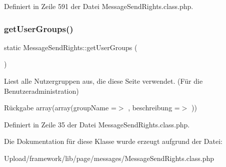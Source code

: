 Definiert in Zeile 591 der Datei Message\+Send\+Rights.\+class.\+php.

\mbox{\label{class_message_send_rights_a3da5ad26d9f72306b8a54345eb5128d0}} 
\subsubsection{\texorpdfstring{get\+User\+Groups()}{getUserGroups()}}
{\footnotesize\ttfamily static Message\+Send\+Rights\+::get\+User\+Groups (\begin{DoxyParamCaption}{ }\end{DoxyParamCaption})\hspace{0.3cm}{\ttfamily [static]}}

Liest alle Nutzergruppen aus, die diese Seite verwendet. (Für die Benutzeradministration) \begin{DoxyReturn}{Rückgabe}
array(array(\textquotesingle{}group\+Name\textquotesingle{} =$>$ \textquotesingle{}\textquotesingle{}, \textquotesingle{}beschreibung\textquotesingle{} =$>$ \textquotesingle{}\textquotesingle{})) 
\end{DoxyReturn}


Definiert in Zeile 35 der Datei Message\+Send\+Rights.\+class.\+php.



Die Dokumentation für diese Klasse wurde erzeugt aufgrund der Datei\+:\begin{DoxyCompactItemize}
\item 
Upload/framework/lib/page/messages/Message\+Send\+Rights.\+class.\+php\end{DoxyCompactItemize}
